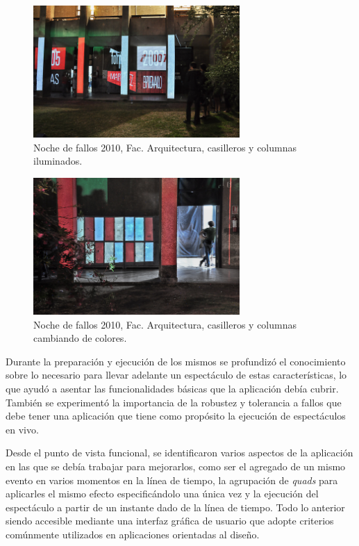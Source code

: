 \begin{figure}[H]
  \centering
    \includegraphics[width=0.7\textwidth]{./Cap7_conclusiones/Arqui2.jpg}
  \caption[http://www.farq.edu.uy/patio/conferencias-exposiciones-y-seminarios/noche-de-fallos-7.html]{Noche de fallos 2010, Fac. Arquitectura, casilleros y columnas iluminados.}
  \label{fig:Arquitectura2}
\end{figure}

\begin{figure}[H]
  \centering
    \includegraphics[width=0.7\textwidth]{./Cap7_conclusiones/Arqui3.jpg}
  \caption[http://www.farq.edu.uy/patio/conferencias-exposiciones-y-seminarios/noche-de-fallos-7.html]{Noche de fallos 2010, Fac. Arquitectura, casilleros y columnas cambiando de colores.}
  \label{fig:Arquitectura3}
\end{figure}

Durante la preparación y ejecución de los mismos se profundizó el conocimiento sobre lo necesario para llevar adelante un espectáculo de estas características, lo que ayudó a asentar las funcionalidades básicas que la aplicación debía cubrir. También se experimentó la importancia de la robustez y tolerancia a fallos que debe tener una aplicación que tiene como propósito la ejecución de espectáculos en vivo.

Desde el punto de vista funcional, se identificaron varios aspectos de la aplicación en las que se debía trabajar para mejorarlos, como ser el agregado de un mismo evento en varios momentos en la línea de tiempo, la agrupación de \emph{quads} para aplicarles el mismo efecto especificándolo una única vez y la ejecución del espectáculo a partir de un instante dado de la línea de tiempo. Todo lo anterior siendo accesible mediante una interfaz gráfica de usuario que adopte criterios comúnmente utilizados en aplicaciones orientadas al diseño.

